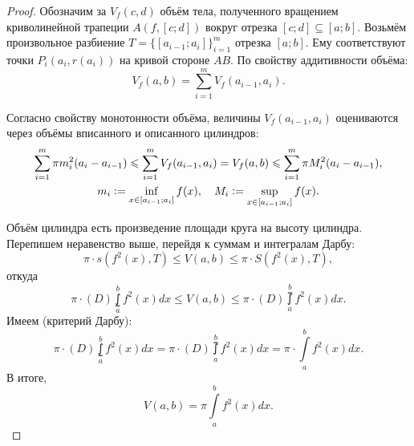 \begin{proof}
    Обозначим за $V_f(c, d)$ объём тела, полученного вращением криволинейной трапеции $A(f, [c; d])$ вокруг отрезка $[c; d] \subseteq [a; b]$. Возьмём произвольное разбиение $T = \{[a_{i - 1}; a_i]\}_{i = 1}^m$ отрезка $[a; b]$. Ему соответствуют точки $P_i(a_i, r(a_i))$ на кривой стороне $AB$. По свойству аддитивности объёма:
    \[
        V_f(a, b) = \sum_{i = 1}^mV_f(a_{i - 1}, a_i).
    \]

    Согласно свойству монотонности объёма, величины $V_f(a_{i - 1}, a_i)$ оцениваются через объёмы вписанного и описанного цилиндров:
    \begin{gather*}
        \sum_{i = 1}^m\pi m_i^2(a_i - a_{i - 1}) \leqslant \sum_{i = 1}^m V_f(a_{i - 1}, a_i) = V_f(a, b) \leqslant \sum_{i = 1}^m\pi M_i^2(a_i - a_{i - 1}),\\
        m_i \vcentcolon = \inf\limits_{x \in [a_{i - 1}; a_i]}f(x),\quad M_i \vcentcolon = \sup\limits_{x \in [a_{i - 1}; a_i]}f(x).
    \end{gather*}

    Объём цилиндра есть произведение площади круга на высоту цилиндра. Перепишем неравенство выше, перейдя к суммам и интегралам Дарбу:
    \[
        \pi \cdot s(f^2(x), T) \leqslant V(a, b) \leqslant \pi \cdot S(f^2(x), T),
    \]
    откуда
    \[
        \pi \cdot (D)\lowint\limits_a^b f^2(x)dx \leqslant V(a, b) \leqslant \pi \cdot (D)\upint\limits_a^b f^2(x)dx.
    \]
    Имеем (критерий Дарбу):
    \[
        \pi \cdot (D)\lowint\limits_a^b f^2(x)dx = \pi \cdot (D)\upint\limits_a^b f^2(x)dx = \pi \cdot \int\limits_a^b f^2(x)dx.
    \]
    В итоге,
    \[
        V(a, b) = \pi \int\limits_a^bf^2(x)dx.
    \]
\end{proof}


